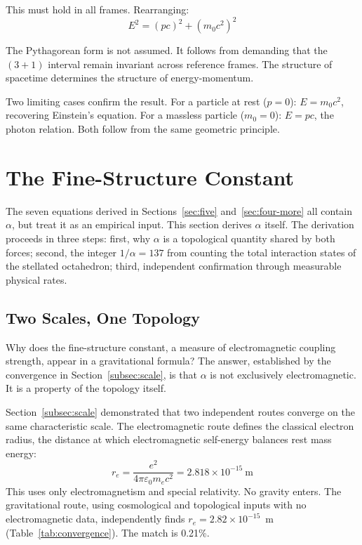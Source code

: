 \documentclass[aps,prd,preprint,superscriptaddress,showpacs,preprintnumbers,amsmath,amssymb,nofootinbib]{revtex4-2}
\begin{document}
This must hold in all frames. Rearranging:
\begin{equation}
E^2 = (pc)^2 + (m_0 c^2)^2
\end{equation}

The Pythagorean form is not assumed. It follows from demanding that the $(3+1)$ interval remain invariant across reference frames. The structure of spacetime determines the structure of energy-momentum.

Two limiting cases confirm the result. For a particle at rest ($p = 0$): $E = m_0 c^2$, recovering Einstein's equation. For a massless particle ($m_0 = 0$): $E = pc$, the photon relation. Both follow from the same geometric principle.

\section{The Fine-Structure Constant}
\label{sec:alpha}

The seven equations derived in Sections~\ref{sec:five} and~\ref{sec:four-more} all contain $\alpha$, but treat it as an empirical input. This section derives $\alpha$ itself. The derivation proceeds in three steps: first, why $\alpha$ is a topological quantity shared by both forces; second, the integer $1/\alpha = 137$ from counting the total interaction states of the stellated octahedron; third, independent confirmation through measurable physical rates.

\subsection{Two Scales, One Topology}
\label{subsec:alpha-scale}

Why does the fine-structure constant, a measure of electromagnetic coupling strength, appear in a gravitational formula? The answer, established by the convergence in Section~\ref{subsec:scale}, is that $\alpha$ is not exclusively electromagnetic. It is a property of the topology itself.

Section~\ref{subsec:scale} demonstrated that two independent routes converge on the same characteristic scale. The electromagnetic route defines the classical electron radius, the distance at which electromagnetic self-energy balances rest mass energy:
\begin{equation}
r_e = \frac{e^2}{4\pi\varepsilon_0 m_e c^2} = 2.818 \times 10^{-15}~\text{m}
\end{equation}
This uses only electromagnetism and special relativity. No gravity enters. The gravitational route, using cosmological and topological inputs with no electromagnetic data, independently finds $r_e = 2.82 \times 10^{-15}$~m (Table~\ref{tab:convergence}). The match is 0.21\%.
\end{document}
